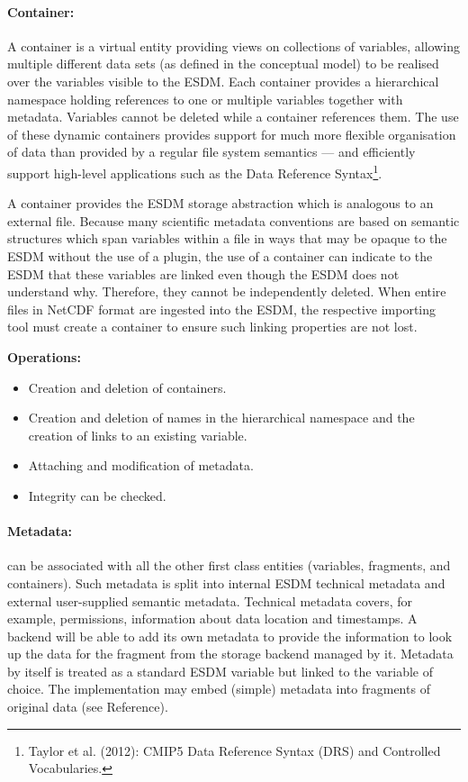 \paragraph{Container:} A container is a virtual entity providing views on collections of variables, allowing multiple different data sets (as defined in the conceptual model) to be realised over the variables visible to the ESDM.  Each container provides a hierarchical namespace holding references to one or multiple variables together with metadata. Variables cannot be deleted while a container references them.  The use of these dynamic containers provides support for much more flexible organisation of data than provided by a regular file system semantics --- and efficiently support high-level applications such as the Data Reference Syntax\footnote{Taylor et al. (2012): CMIP5 Data Reference Syntax (DRS) and
Controlled Vocabularies.}.

A container provides the ESDM storage abstraction which is analogous to an external file. Because many scientific metadata conventions are based on semantic structures which span variables within a file in ways that may be opaque to the ESDM without the use of a plugin, the use of a container can indicate to the ESDM that these variables are linked even though the ESDM does not understand why. Therefore, they cannot be independently deleted.
When entire files in NetCDF format are ingested into the ESDM, the respective importing tool must create a container to ensure such linking properties are not lost.

\textbf{Operations:}
\begin{itemize}
	\item Creation and deletion of containers.
	\item Creation and deletion of names in the hierarchical namespace and the creation of links to an existing variable.
	\item Attaching and modification of metadata.
	\item Integrity can be checked.
\end{itemize}

\paragraph{Metadata:} can be associated with all the other first class entities (variables, fragments, and containers). Such metadata is split into internal ESDM technical metadata and external user-supplied semantic metadata.
Technical metadata covers, for example, permissions, information about data location and timestamps.
A backend will be able to add its own metadata to provide the information to look up the data for the fragment from the storage backend managed by it.
Metadata by itself is treated as a standard ESDM variable but linked to the variable of choice.
The implementation may embed (simple) metadata into fragments of original data (see Reference).

